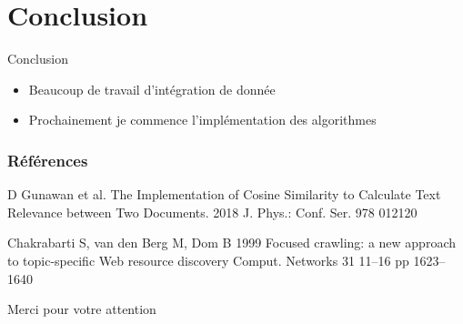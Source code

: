 \documentclass[xelatex,12pt]{beamer}
\begin{document}
\section{Conclusion}
  \begin{frame}{Conclusion}
  \begin{itemize}
		\item Beaucoup de travail d'intégration de donnée
		\item Prochainement je commence l'implémentation des algorithmes
\end{itemize}
  \end{frame}

\begin{frame}
\frametitle{Références}
\begin{thebibliography}{9}
D Gunawan et al. The Implementation of Cosine Similarity to Calculate Text Relevance
between Two Documents. 2018 J. Phys.: Conf. Ser. 978 012120


Chakrabarti S, van den Berg M, Dom B 1999 Focused crawling: a new approach to topic-specific 
Web resource discovery Comput. Networks 31 11–16 pp 1623–1640 
\end{thebibliography}
\end{frame}



\begin{frame}
  \begin{block}{}
  \centering
  Merci pour votre attention
  \end{block}
\end{frame}
\end{document}
